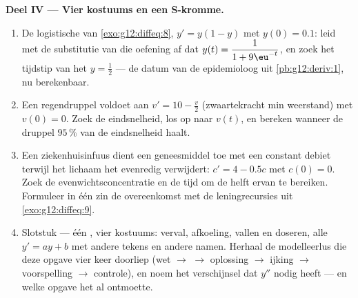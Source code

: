 \begin{problem}
\medskip
\noindent\textbf{Deel IV --- Vier kostuums en een S-kromme.}
\begin{enumerate}[resume]
  \item De logistische  van \cref{exo:g12:diffeq:8},
        $y' = y(1 - y)$ met $y(0) = 0.1$: leid met de substitutie van die
        oefening af dat $y(t) = \dfrac{1}{1 + 9\eu^{-t}}$, en zoek het
        tijdstip van het  $y = \frac12$ --- de datum van de
        epidemioloog uit \cref{pb:g12:deriv:1}, nu berekenbaar.
  \item Een regendruppel voldoet aan $v' = 10 - \frac v2$ (zwaartekracht min
        weerstand) met $v(0) = 0$. Zoek de eindsnelheid, los op naar $v(t)$,
        en bereken wanneer de druppel $95\,\%$ van de eindsnelheid haalt.
  \item Een ziekenhuisinfuus dient een geneesmiddel toe met een constant
        debiet terwijl het lichaam het evenredig verwijdert:
        $c' = 4 - 0.5c$ met $c(0) = 0$. Zoek de evenwichtsconcentratie en de
        tijd om de helft ervan te bereiken. Formuleer in één zin de
        overeenkomst met de leningrecursies uit \cref{exo:g12:diffeq:9}.
  \item Slotstuk --- één , vier kostuums: verval, afkoeling,
        vallen en doseren, alle $y' = ay + b$ met andere tekens en andere
        namen. Herhaal de modelleerlus die deze opgave vier keer doorliep
        (wet $\to$  $\to$ oplossing $\to$ ijking $\to$
        voorspelling $\to$ controle), en noem het verschijnsel dat $y''$
        nodig heeft --- en welke opgave het al ontmoette.
\end{enumerate}
\end{problem}
